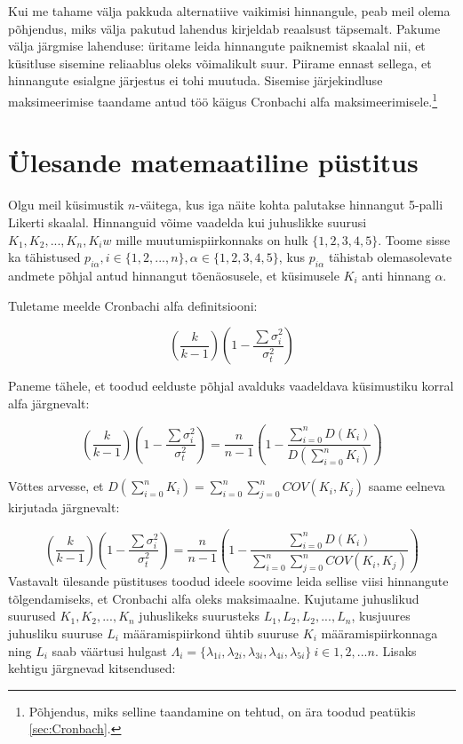 \documentclass[a4paper,12pt]{article}
\numberwithin{equation}{section}
\theoremstyle{definition}
\begin{document}
Kui me tahame välja pakkuda alternatiive vaikimisi hinnangule, peab meil olema põhjendus, miks välja pakutud lahendus kirjeldab reaalsust täpsemalt. Pakume välja järgmise lahenduse: 
\"uritame leida hinnangute paiknemist skaalal nii, et k\"usitluse sisemine reliaablus oleks võimalikult suur. Piirame ennast sellega, et  hinnangute esialgne järjestus ei tohi muutuda. Sisemise järjekindluse maksimeerimise taandame antud töö käigus Cronbachi alfa maksimeerimisele.\footnote{Põhjendus, miks selline taandamine on tehtud, on ära toodud peat\"ukis \hyperref[sec:Cronbach]{\ref*{sec:Cronbach}}.} 
 

\section{\"Ulesande matemaatiline p\"ustitus}

Olgu meil k\"usimustik $n$-väitega, kus iga näite kohta palutakse hinnangut 5-palli Likerti skaalal. Hinnanguid võime vaadelda kui juhuslikke suurusi $K_1,K_2,...,K_n, K_iw$ mille muutumispiirkonnaks on hulk $\{1,2,3,4,5\}$. Toome sisse ka tähistused $p_{i \alpha}, i \in \{1,2,...,n\}, \alpha \in \{1,2,3,4,5\}$, kus $p_{i \alpha}$ tähistab olemasolevate andmete põhjal antud hinnangut tõenäosusele, et k\"usimusele $K_i$ anti hinnang $\alpha$. 

Tuletame meelde Cronbachi alfa definitsiooni:


\begin{equation*}
(\frac{k}{k-1})( 1 - \frac{\sum \sigma_i^2}{\sigma_t^2})
\end{equation*}

Paneme tähele, et toodud eelduste põhjal avalduks vaadeldava k\"usimustiku korral alfa järgnevalt:

 
\begin{equation*}
(\frac{k}{k-1})( 1 - \frac{\sum \sigma_i^2}{\sigma_t^2}) = \frac{n}{n-1}\left(1 - \frac
{\sum \limits_{i=0}^n D(K_i)}{D(\sum \limits_{i=0}^n K_i)}\right)
\end{equation*}

Võttes arvesse, et $D(\sum \limits_{i=0}^n K_i) = \sum \limits_{i=0}^n \sum \limits_{j=0}^n COV(K_i,K_j)$ saame eelneva kirjutada järgnevalt:

\begin{equation*}
(\frac{k}{k-1})( 1 - \frac{\sum \sigma_i^2}{\sigma_t^2}) = \frac{n}{n-1}\left(1 - \frac
{\sum \limits_{i=0}^n D(K_i)}{\sum \limits_{i=0}^n \sum \limits_{j=0}^n COV(K_i,K_j)}\right)
\end{equation*}
Vastavalt \"ulesande p\"ustituses toodud ideele soovime leida sellise viisi hinnangute tõlgendamiseks, et Cronbachi alfa oleks maksimaalne. Kujutame juhuslikud suurused $K_1,K_2,...,K_n$ juhuslikeks suurusteks $L_1, L_2,L_2,...,L_n$, kusjuures juhusliku suuruse $L_i$ määramispiirkond \"uhtib suuruse $K_i$ määramispiirkonnaga ning $L_i$ saab väärtusi hulgast $\Lambda_i = \{\lambda_{1i},\lambda_{2i},\lambda_{3i},\lambda_{4i},\lambda_{5i}\} ~ i \in {1,2,...n}$. Lisaks kehtigu järgnevad kitsendused: 
\end{document}
